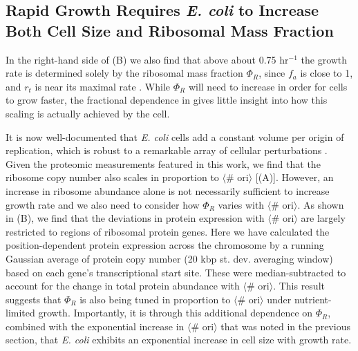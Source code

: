 \subsection{Rapid Growth Requires \textit{E. coli} to Increase Both Cell Size and Ribosomal
Mass Fraction}
In the right-hand side of (B) we also find that above about 0.75
hr$^{-1}$ the growth rate is determined solely by the ribosomal mass fraction
$\Phi_R$, since $f_a$ is close to 1, and $r_t$ is near its maximal rate
\citep{dai2016}. While $\Phi_R$ will need to increase in order for cells to
grow faster, the fractional dependence in 
gives little insight into how this scaling is actually achieved by the cell.

It is now well-documented that \textit{E. coli} cells add a constant volume per
origin of replication, which is robust to a remarkable array of cellular
perturbations \citep{si2017}. Given the proteomic measurements featured in this
work, we find that the ribosome copy number also scales in proportion to
$\langle$\# ori$\rangle$ [(A)]. However,  an
increase in ribosome abundance alone is not necessarily sufficient to increase
growth rate and we also need to consider how $\Phi_R$ varies with $\langle$\#
ori$\rangle$. As shown in (B), we find
that the deviations in protein expression with $\langle$\# ori$\rangle$ are
largely restricted to regions of ribosomal protein genes. Here we have calculated the position-dependent
protein expression across the chromosome by a running Gaussian average of
protein copy number (20 kbp st. dev. averaging window) based on each gene's
transcriptional start site. These were median-subtracted to account for the
change in total protein abundance with $\langle$\# ori$\rangle$. This result
suggests that $\Phi_R$ is also being tuned in proportion to $\langle$\#
ori$\rangle$ under nutrient-limited growth. Importantly, it is through this
additional dependence on $\Phi_R$, combined with the exponential increase in
$\langle$\# ori$\rangle$ that was noted in the previous section, that \textit{E. coli}
exhibits an exponential increase in cell size with growth rate.

